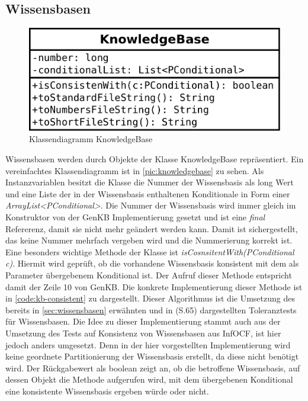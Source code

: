 \documentclass[12pt,a4paper]{article}
\begin{document}
\subsection{Wissensbasen}



\begin{figure}
\includegraphics[width=0.45\linewidth]{bilder/KnowledgeBase.png}
\caption{Klassendiagramm KnowledgeBase}
\label{pic:knowledgebase}
\end{figure}



Wissensbasen werden durch Objekte der Klasse KnowledgeBase repräsentiert. Ein vereinfachtes Klassendiagramm ist in \autoref{pic:knowledgebase} zu sehen. Als Instanzvariablen besitzt die Klasse die Nummer der Wissensbasis als long Wert und eine Liste der in der Wissensbasis enthaltenen Konditionale in Form einer \textit{ArrayList<PConditional>}. Die Nummer der Wissensbasis wird immer gleich im Konstruktor von der GenKB Implementierung gesetzt und ist eine \textit{final} Refererenz, damit sie nicht mehr geändert werden kann. Damit ist sichergestellt, das keine Nummer mehrfach vergeben wird und die Nummerierung korrekt ist.\\
Eine besonders wichtige Methode der Klasse ist \textit{isCosnsitentWith(PConditional c)}. Hiermit wird geprüft, ob die vorhandene Wissensbasis konsistent mit dem als Parameter übergebenem Konditional ist. Der Aufruf dieser Methode entspricht damit der Zeile 10 von GenKB. Die konkrete Implementierung dieser Methode ist in \autoref{code:kb-consistent} zu dargestellt. Dieser Algorithmus ist die Umsetzung des bereits in \autoref{sec:wissensbasen} erwähnten und in \cite{goldszmidt96}(S.65) dargestellten Toleranztests für Wissensbasen.  Die Idee zu dieser Implementierung stammt auch aus der Umsetzung des Tests auf Konsistenz von Wissensbasen aus InfOCF, ist hier jedoch anders umgesetzt. Denn in der hier vorgestellten Implementierung wird keine geordnete Partitionierung der Wissensbasis erstellt, da diese nicht benötigt wird. Der Rückgabewert als boolean zeigt an, ob die betroffene Wissensbasis, auf dessen Objekt die Methode aufgerufen wird, mit dem übergebenen Konditional eine konsistente Wissensbasis ergeben würde oder nicht.
\end{document}
